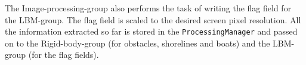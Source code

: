 





The Image-processing-group also performs the task of writing the flag field for the LBM-group. The flag field is scaled to the desired screen pixel resolution. All the information extracted so far is stored in the \verb|ProcessingManager| and passed on to the Rigid-body-group (for obstacles, shorelines and boats) and the LBM-group (for the flag fields).
